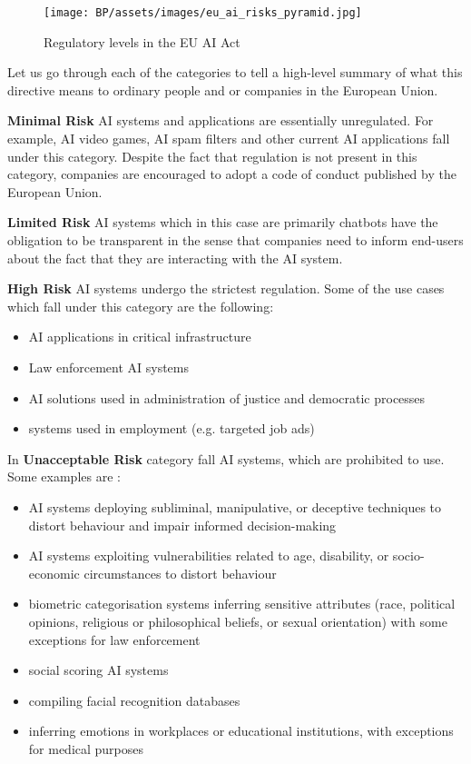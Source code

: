 \begin{figure}[h]
\begin{centering}
\texttt{[image: BP/assets/images/eu\_ai\_risks\_pyramid.jpg]}
\par\end{centering}
\caption{Regulatory levels in the EU AI Act \cite{eu_ai_regulation_picture}
 \label{fig:ai-act-pyramid}}
\end{figure}

Let us go through each of the categories to tell a high-level summary of what this directive means to ordinary people and or companies in the European Union.

\textbf{Minimal Risk} AI systems and applications are essentially unregulated. For example, AI video games, AI spam filters and other current AI applications fall under this category. Despite the fact that regulation is not present in this category, companies are encouraged to adopt a code of conduct published by the European Union.

\textbf{Limited Risk} AI systems which in this case are primarily chatbots have the obligation to be transparent in the sense that companies need to inform end-users about the fact that they are interacting with the AI system.

\textbf{High Risk} AI systems undergo the strictest regulation. Some of the use cases which fall under this category are the following\cite{eu_ai_act_summary}:
\begin{itemize}
    \item AI applications in critical infrastructure
    \item Law enforcement AI systems
    \item AI solutions used in administration of justice and democratic processes
    \item systems used in employment (e.g. targeted job ads)
\end{itemize}

In \textbf{Unacceptable Risk} category fall AI systems, which are prohibited to use. Some examples are \cite{eu_ai_act_summary}:
\begin{itemize}
    \item AI systems deploying subliminal, manipulative, or deceptive techniques to distort behaviour and impair informed decision-making
    \item AI systems exploiting vulnerabilities related to age, disability, or socio-economic circumstances to distort behaviour
    \item biometric categorisation systems inferring sensitive attributes (race, political opinions, religious or philosophical beliefs, or sexual orientation) with some exceptions for law enforcement
    \item social scoring AI systems
    \item compiling facial recognition databases
    \item inferring emotions in workplaces or educational institutions, with exceptions for medical purposes
\end{itemize}


